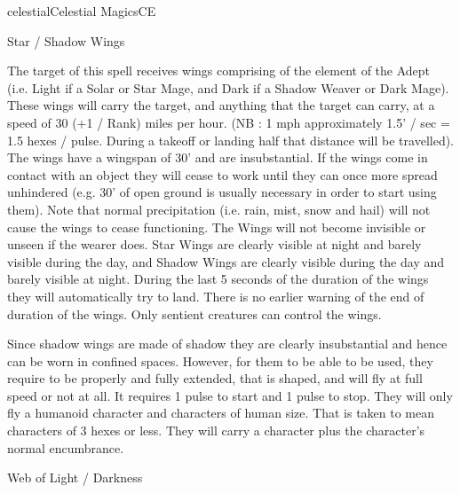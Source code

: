 \begin{College}[1.3]{celestial}{Celestial Magics}{CE}
\begin{spell}[S-5]{Star / Shadow Wings}
\begin{effects}
The target of this spell receives wings comprising of the element of
the Adept (i.e.  Light if a Solar or Star Mage, and Dark if a Shadow
Weaver or Dark Mage). These wings will carry the target, and anything
that the target can carry, at a speed of 30 (+1 / Rank) miles per
hour.  (NB : 1 mph approximately 1.5’ / sec = 1.5 hexes / pulse.
During a takeoff or landing half that distance will be travelled).
The wings have a wingspan of 30’ and are insubstantial. If the wings
come in contact with an object they will cease to work until they can
once more spread unhindered (e.g. 30’ of open ground is usually
necessary in order to start using them).  Note that normal
precipitation (i.e.  rain, mist, snow and hail) will not cause the
wings to cease functioning.  The Wings will not become invisible or
unseen if the wearer does.  Star Wings are clearly visible at night
and barely visible during the day, and Shadow Wings are clearly
visible during the day and barely visible at night.  During the last 5
seconds of the duration of the wings they will automatically try to
land.  There is no earlier warning of the end of duration of the
wings. Only sentient creatures can control the wings.

Since shadow wings are made of shadow they are clearly insubstantial
and hence can be worn in confined spaces.  However, for them to be
able to be used, they require to be properly and fully extended, that
is shaped, and will fly at full speed or not at all. It requires 1
pulse to start and 1 pulse to stop.  They will only fly a humanoid
character and characters of human size.  That is taken to mean
characters of 3 hexes or less.  They will carry a character plus the
character’s normal encumbrance.
\end{effects}
\end{spell}

\begin{spell}[S-6]{Web of Light / Darkness}


\end{spell}
\end{College}
